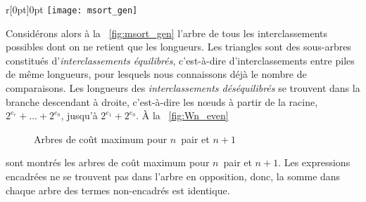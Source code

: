 \begin{wrapfigure}[9]{r}[0pt]{0pt}
\centering
\texttt{[image: msort\_gen]}%
\caption{\(\sum_{j=0}^{r}2^{e_j}\) clés}
\label{fig:msort_gen}
\end{wrapfigure}
Considérons alors à la \fig~\ref{fig:msort_gen} l'arbre de tous les
interclassements possibles
dont on ne retient que les longueurs. Les triangles sont des
sous-arbres constitués d'\emph{interclassements équilibrés},
c'est-à-dire d'interclassements entre piles de même longueurs, pour
lesquels nous connaissons déjà le nombre de comparaisons. Les
longueurs des \emph{interclassements déséquilibrés} se trouvent dans
la branche descendant à droite, c'est-à-dire les n{\oe}uds à partir de
la racine, \(2^{e_r}+ \dots + 2^{e_0}\), jusqu'à \(2^{e_1} +
2^{e_0}\). À la
\fig~\vref{fig:Wn_even}
\begin{figure}
\centering
{}
\qquad
{}
\caption{Arbres de coût maximum pour \(n\)~pair et \(n+1\)}
\label{fig:Wn_even}
\end{figure}
sont montrés les arbres de coût maximum pour \(n\)~pair et
\(n+1\). Les expressions encadrées ne se trouvent pas dans l'arbre en
opposition, donc, la somme dans chaque arbre des termes non-encadrés
est identique.
